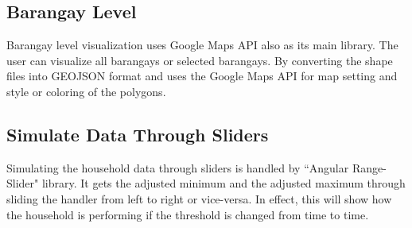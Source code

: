\subsection{Barangay Level}
Barangay level visualization uses Google Maps API also as its main library. The user can visualize all barangays or selected barangays. By converting the shape files into GEOJSON format and uses the Google Maps API for map setting and style or coloring of the polygons. 

\subsection{Simulate Data Through Sliders}
Simulating the household data through sliders is handled by ``Angular Range-Slider" library. It gets the adjusted minimum and the adjusted maximum through sliding the handler from left to right or vice-versa. In effect, this will show how the household is performing if the threshold is changed from time to time.

\clearpage